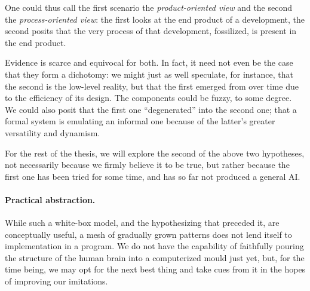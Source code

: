 One could thus call the first scenario the \emph{product-oriented view} and the second the \emph{ process-oriented view}: the first looks at the end product of a development, the second posits that the very process of that development, fossilized, is present in the end product.

Evidence is scarce and equivocal for both. In fact, it need not even be the case that they form a dichotomy: we might just as well speculate, for instance, that the second is the low-level reality, but that the first emerged from over time due to the efficiency of its design. The components could be fuzzy, to some degree. We could also posit that the first one ``degenerated'' into the second one; that a formal system is emulating an informal one because of the latter's greater versatility and dynamism.

For the rest of the thesis, we will explore the second of the above two hypotheses, not necessarily because we firmly believe it to be true, but rather because the first one has been tried for some time, and has so far not produced a general AI.

\paragraph{Practical abstraction.} While such a white-box model, and the hypothesizing that preceded it, are conceptually useful, a mesh of gradually grown patterns does not lend itself to implementation in a program. We do not have the capability of faithfully pouring the structure of the human brain into a computerized mould just yet, but, for the time being, we may opt for the next best thing and take cues from it in the hopes of improving our imitations.

